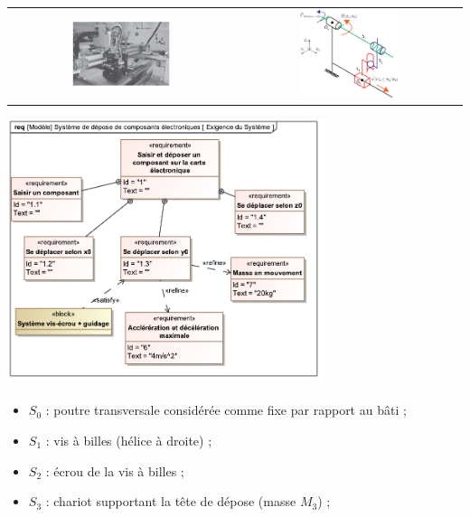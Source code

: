 \documentclass[10pt,fleqn]{article} %
\begin{document}
\begin{exemple}
\begin{center}
\begin{tabular}{cc}
\includegraphics[width=0.45\textwidth]{images/axe_y_photo.png}
&
\includegraphics[width=0.45\textwidth]{images/schema_cine_depose_composant.pdf}
\end{tabular}
\includegraphics[width=0.7\textwidth]{images/req_systeme_depose.pdf}
\end{center}
\begin{itemize}
\item $S_0$ : poutre transversale considérée comme fixe par rapport au bâti ;
\item $S_1$ : vis à billes (hélice à droite) ;
\item $S_2$ : écrou de la vis à billes ;
\item $S_3$ : chariot supportant la tête de dépose (masse $M_3$) ;
\end{itemize}
\end{exemple}
\end{document}
